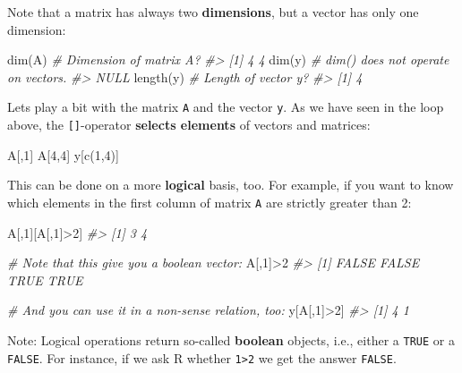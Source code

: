\documentclass[
  14pt,
]{memoir}
\newenvironment{Shaded}{\begin{snugshade}}{\end{snugshade}}
\newcommand{\CommentTok}[1]{\textcolor[rgb]{0.56,0.35,0.01}{\textit{#1}}}
\newcommand{\DecValTok}[1]{\textcolor[rgb]{0.00,0.00,0.81}{#1}}
\newcommand{\FunctionTok}[1]{\textcolor[rgb]{0.00,0.00,0.00}{#1}}
\newcommand{\NormalTok}[1]{#1}
\newcommand{\SpecialCharTok}[1]{\textcolor[rgb]{0.00,0.00,0.00}{#1}}
\begin{document}
Note that a matrix has always two \textbf{dimensions}, but a vector has only one dimension:

\begin{Shaded}
\begin{Highlighting}[]
\FunctionTok{dim}\NormalTok{(A)    }\CommentTok{\# Dimension of matrix A?}
\CommentTok{\#\textgreater{} [1] 4 4}
\FunctionTok{dim}\NormalTok{(y)    }\CommentTok{\# dim() does not operate on vectors.}
\CommentTok{\#\textgreater{} NULL}
\FunctionTok{length}\NormalTok{(y) }\CommentTok{\# Length of vector y?}
\CommentTok{\#\textgreater{} [1] 4}
\end{Highlighting}
\end{Shaded}

Lets play a bit with the matrix \texttt{A} and the vector \texttt{y}. As we have seen in the loop above, the \texttt{{[}{]}}-operator \textbf{selects elements} of vectors and matrices:

\begin{Shaded}
\begin{Highlighting}[]
\NormalTok{A[,}\DecValTok{1}\NormalTok{]}
\NormalTok{A[}\DecValTok{4}\NormalTok{,}\DecValTok{4}\NormalTok{]}
\NormalTok{y[}\FunctionTok{c}\NormalTok{(}\DecValTok{1}\NormalTok{,}\DecValTok{4}\NormalTok{)]}
\end{Highlighting}
\end{Shaded}

This can be done on a more \textbf{logical} basis, too. For example, if you want to know which elements in the first column of matrix \texttt{A} are strictly greater than 2:

\begin{Shaded}
\begin{Highlighting}[]
\NormalTok{A[,}\DecValTok{1}\NormalTok{][A[,}\DecValTok{1}\NormalTok{]}\SpecialCharTok{\textgreater{}}\DecValTok{2}\NormalTok{]}
\CommentTok{\#\textgreater{} [1] 3 4}

\CommentTok{\# Note that this give you a boolean vector:}
\NormalTok{A[,}\DecValTok{1}\NormalTok{]}\SpecialCharTok{\textgreater{}}\DecValTok{2}
\CommentTok{\#\textgreater{} [1] FALSE FALSE  TRUE  TRUE}

\CommentTok{\# And you can use it in a non{-}sense relation, too:}
\NormalTok{y[A[,}\DecValTok{1}\NormalTok{]}\SpecialCharTok{\textgreater{}}\DecValTok{2}\NormalTok{]}
\CommentTok{\#\textgreater{} [1] 4 1}
\end{Highlighting}
\end{Shaded}

Note: Logical operations return so-called \textbf{boolean} objects, i.e., either a \texttt{TRUE} or a \texttt{FALSE}. For instance, if we ask R whether \texttt{1\textgreater{}2} we get the answer \texttt{FALSE}.
\end{document}
